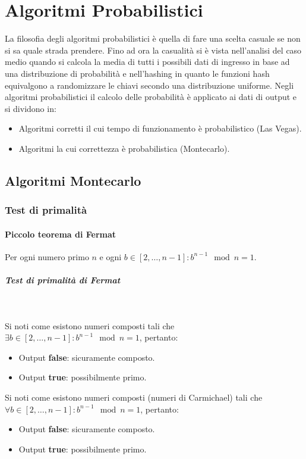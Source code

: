 \chapter{Algoritmi Probabilistici}
La filosofia degli algoritmi probabilistici \`e quella di fare una scelta casuale se non si sa quale strada prendere. Fino ad ora la casualit\`a si \`e vista nell'analisi del caso medio
quando si calcola la media di tutti i possibili dati di ingresso in base ad una distribuzione di probabilit\`a e nell'hashing in quanto le funzioni hash equivalgono a randomizzare le
chiavi secondo una distribuzione uniforme. Negli algoritmi probabilistici il calcolo delle probabilit\`a \`e applicato ai dati di output e si dividono in:
\begin{itemize}
	\item Algoritmi corretti il cui tempo di funzionamento \`e probabilistico (Las Vegas).
	\item Algoritmi la cui correttezza \`e probabilistica (Montecarlo).
\end{itemize}
\section{Algoritmi Montecarlo}
\subsection{Test di primalit\`a}
\subsubsection{Piccolo teorema di Fermat}
Per ogni numero primo $n$ e ogni $b\in [2,\dots, n - 1]: b^{n-1}\mod n = 1$. 
\paragraph{Test di primalit\`a di Fermat}\mbox{}\\
\begin{multicols}{2}

Si noti come esistono numeri composti tali che $\exists b\in[2, \dots, n - 1]: b^{n-1}\mod n = 1$, pertanto:
\begin{itemize}
	\item Output \textbf{false}: sicuramente composto.
	\item Output \textbf{true}: possibilmente primo.
\end{itemize}
\columnbreak

Si noti come esistono numeri composti (numeri di Carmichael) tali che $\forall b\in[2, \dots, n - 1]: b^{n-1}\mod n = 1$, pertanto:
\begin{itemize}
	\item Output \textbf{false}: sicuramente composto.
	\item Output \textbf{true}: possibilmente primo.
\end{itemize}
\end{multicols}
